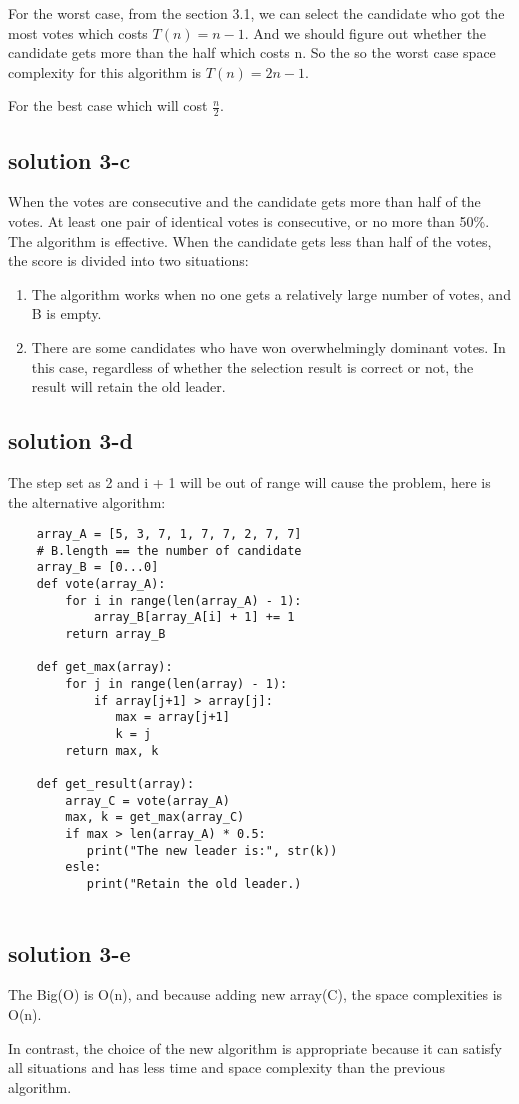 \documentclass{article}
\begin{document}
For the worst case, from the section 3.1, we can select the candidate who got the most votes which costs $T(n) = n - 1$.
And we should figure out whether the candidate gets more than the half which costs n. So the so the worst case space complexity for this algorithm is
$T(n) = 2n -1$.

For the best case which will cost $\frac{n}{2}$.



\subsection{solution 3-c}
When the votes are consecutive and the candidate gets more than half of the votes. At least one pair of identical votes is consecutive, or no more than 50\%. The algorithm is effective.
When the candidate gets less than half of the votes, the score is divided into two situations:
\begin{enumerate}
    \item The algorithm works when no one gets a relatively large number of votes, and B is empty.
    \item There are some candidates who have won overwhelmingly dominant votes. In this case, regardless of whether the selection result is correct or not, the result will retain the old leader.
\end{enumerate}


\subsection{solution 3-d}
The step set as 2 and i + 1 will be out of range will cause the problem,
here is the alternative algorithm:

\begin{lstlisting}
    array_A = [5, 3, 7, 1, 7, 7, 2, 7, 7]
    # B.length == the number of candidate
    array_B = [0...0]
    def vote(array_A):
        for i in range(len(array_A) - 1):
            array_B[array_A[i] + 1] += 1
        return array_B
    
    def get_max(array):
        for j in range(len(array) - 1):
            if array[j+1] > array[j]:
               max = array[j+1]
               k = j
        return max, k
    
    def get_result(array):
        array_C = vote(array_A)
        max, k = get_max(array_C)
        if max > len(array_A) * 0.5:
           print("The new leader is:", str(k))
        esle:
           print("Retain the old leader.)
    

\end{lstlisting}


\subsection{solution 3-e}
The Big(O) is O(n),
and because adding new array(C), the space complexities is O(n).

In contrast, the choice of the new algorithm is appropriate because it can satisfy all situations and has less time and space complexity than the previous algorithm.
\end{document}
